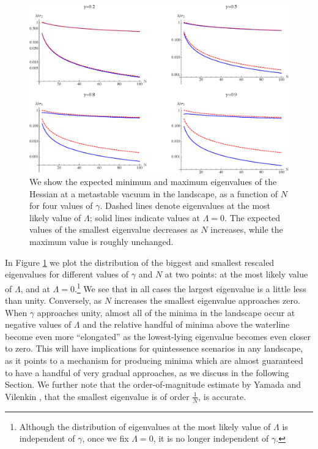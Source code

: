 \documentclass[12pt]{article}
\begin{document}
\begin{figure} 
  \centering
  \includegraphics[width=.9\linewidth]{eign.eps}
  \caption{We show the expected minimum and maximum eigenvalues of the Hessian at a metastable vacuum in the landscape, as a function of $N$ for four values of $\gamma$.  Dashed lines denote eigenvalues at the most likely value of $\Lambda$; solid lines indicate values at $\Lambda=0$. The expected values of the smallest eigenvalue decreases as $N$ increases, while the maximum value is roughly unchanged. }
  \label{eigen}
\end{figure}

In Figure \ref{eigen} we plot the distribution of the biggest and smallest rescaled eigenvalues for different values of $\gamma$ and $N$ at two points: at the most likely value of $\Lambda$, and at $\Lambda=0$.\footnote{Although the distribution of eigenvalues at the most likely value of $\Lambda$ is independent of $\gamma$, once we fix $\Lambda=0$, it is no longer independent of $\gamma$.} We see that in all cases the largest eigenvalue is a little less than unity. Conversely, as $N$ increases the smallest eigenvalue approaches zero. When $\gamma$ approaches unity, almost all of the minima in the landscape  occur at negative values of $\Lambda$ and the relative handful of minima above the waterline become even more ``elongated'' as the lowest-lying eigenvalue becomes even closer to zero. This will have implications for quintessence scenarios in any landscape, as it points to a mechanism for producing minima which are almost guaranteed to have a handful of very gradual approaches, as we discuss in the following Section. We further note that the order-of-magnitude estimate by Yamada and Vilenkin \cite{Yamada2018}, that the smallest eigenvalue is of order $\frac{1}{N}$, is accurate.
\end{document}
